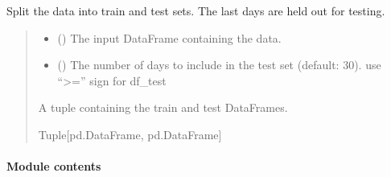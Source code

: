 \documentclass[letterpaper,10pt,english]{sphinxmanual}
\begin{document}
\begin{fulllineitems}
\label{\detokenize{src_demand_forecast.data:src_demand_forecast.data.split_dataset.split_train_test}}
\pysigstartsignatures
{}
\pysigstopsignatures
\sphinxAtStartPar
Split the data into train and test sets.
The last  days are held out for testing.
\begin{quote}\begin{description}
\begin{itemize}
\item {} 
\sphinxAtStartPar
{} () \textendash{} The input DataFrame containing the data.

\item {} 
\sphinxAtStartPar
{} () \textendash{} The number of days to include in the test set (default: 30).
use “\textgreater{}=” sign for df\_test

\end{itemize}

\sphinxAtStartPar
A tuple containing the train and test DataFrames.

\sphinxAtStartPar
Tuple{[}pd.DataFrame, pd.DataFrame{]}

\end{description}\end{quote}

\end{fulllineitems}



\paragraph{Module contents}
\label{\detokenize{src_demand_forecast.data:module-src_demand_forecast.data}}\label{\detokenize{src_demand_forecast.data:module-contents}}
\sphinxstepscope
\end{document}
